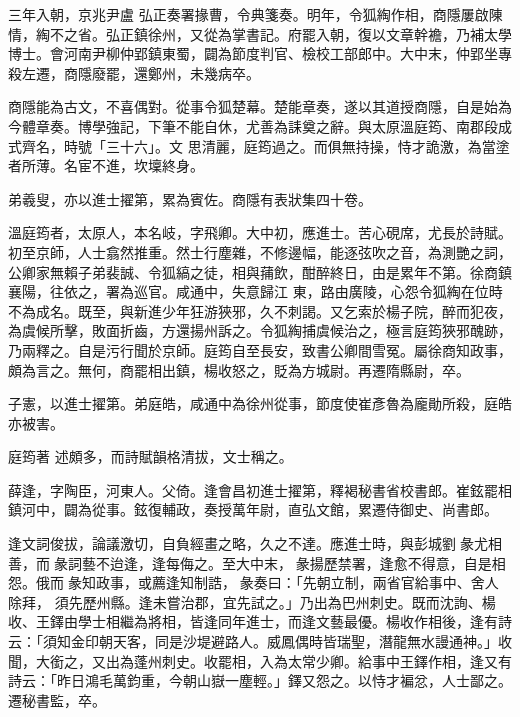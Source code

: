 \begin{pinyinscope}
 三年入朝，京兆尹盧
 弘正奏署掾曹，令典箋奏。明年，令狐綯作相，商隱屢啟陳情，綯不之省。弘正鎮徐州，又從為掌書記。府罷入朝，復以文章幹襜，乃補太學博士。會河南尹柳仲郢鎮東蜀，闢為節度判官、檢校工部郎中。大中末，仲郢坐專殺左遷，商隱廢罷，還鄭州，未幾病卒。



 商隱能為古文，不喜偶對。從事令狐楚幕。楚能章奏，遂以其道授商隱，自是始為今體章奏。博學強記，下筆不能自休，尤善為誄奠之辭。與太原溫庭筠、南郡段成式齊名，時號「三十六」。文
 思清麗，庭筠過之。而俱無持操，恃才詭激，為當塗者所薄。名宦不進，坎壈終身。



 弟羲叟，亦以進士擢第，累為賓佐。商隱有表狀集四十卷。



 溫庭筠者，太原人，本名岐，字飛卿。大中初，應進士。苦心硯席，尤長於詩賦。初至京師，人士翕然推重。然士行塵雜，不修邊幅，能逐弦吹之音，為測艷之詞，公卿家無賴子弟裴誠、令狐縞之徒，相與蒱飲，酣醉終日，由是累年不第。徐商鎮襄陽，往依之，署為巡官。咸通中，失意歸江
 東，路由廣陵，心怨令狐綯在位時不為成名。既至，與新進少年狂游狹邪，久不刺謁。又乞索於楊子院，醉而犯夜，為虞候所擊，敗面折齒，方還揚州訴之。令狐綯捕虞候治之，極言庭筠狹邪醜跡，乃兩釋之。自是污行聞於京師。庭筠自至長安，致書公卿間雪冤。屬徐商知政事，頗為言之。無何，商罷相出鎮，楊收怒之，貶為方城尉。再遷隋縣尉，卒。



 子憲，以進士擢第。弟庭皓，咸通中為徐州從事，節度使崔彥魯為龐勛所殺，庭皓亦被害。



 庭筠著
 述頗多，而詩賦韻格清拔，文士稱之。



 薛逢，字陶臣，河東人。父倚。逢會昌初進士擢第，釋褐秘書省校書郎。崔鉉罷相鎮河中，闢為從事。鉉復輔政，奏授萬年尉，直弘文館，累遷侍御史、尚書郎。



 逢文詞俊拔，論議激切，自負經畫之略，久之不達。應進士時，與彭城劉彖尤相善，而彖詞藝不迨逢，逢每侮之。至大中末，彖揚歷禁署，逢愈不得意，自是相怨。俄而彖知政事，或薦逢知制誥，彖奏曰：「先朝立制，兩省官給事中、舍人除拜，
 須先歷州縣。逢未嘗治郡，宜先試之。」乃出為巴州刺史。既而沈詢、楊收、王鐸由學士相繼為將相，皆逢同年進士，而逢文藝最優。楊收作相後，逢有詩云：「須知金印朝天客，同是沙堤避路人。威鳳偶時皆瑞聖，潛龍無水謾通神。」收聞，大銜之，又出為蓬州刺史。收罷相，入為太常少卿。給事中王鐸作相，逢又有詩云：「昨日鴻毛萬鈞重，今朝山嶽一塵輕。」鐸又怨之。以恃才褊忿，人士鄙之。遷秘書監，卒。




\end{pinyinscope}

